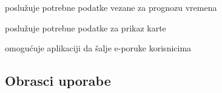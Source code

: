 \begin{packed_enum}
\begin{packed_enum}
				\end{packed_enum}
				
				\item {}
				
				\begin{packed_enum}
					
					\item poslužuje potrebne podatke vezane za prognozu vremena
					
				\end{packed_enum}
				
				\item {}
				
				\begin{packed_enum}
					
					\item poslužuje potrebne podatke za prikaz karte
					
				\end{packed_enum}
				
				\item {}
				
				\begin{packed_enum}
					
					\item omogućuje aplikaciji da šalje e-poruke korisnicima
					
				\end{packed_enum}
				
			\end{packed_enum}
			
			\eject 
			
			
				
			\subsection{Obrasci uporabe}
					
					\setcounter{UseCaseCounter}{1}
					
